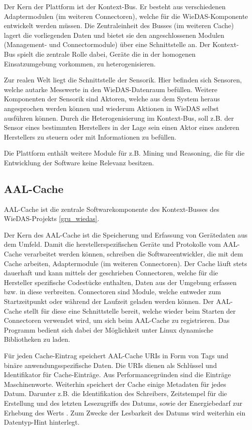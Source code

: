 Der Kern der Plattform ist der Kontext-Bus.
Er besteht aus verschiedenen Adaptermodulen (im weiteren Connectoren), welche für die WieDAS-Komponente
entwickelt werden müssen.
Die Zentraleinheit des Busses (im weiteren Cache) lagert die vorliegenden Daten und bietet sie
den angeschlossenen Modulen (Management- und Connectormodule) über eine Schnittstelle an.
Der Kontext-Bus spielt die zentrale Rolle dabei, Geräte die in der homogenen Einsatzumgebung vorkommen, zu
heterogenisieren.

Zur realen Welt liegt die Schnittstelle der Sensorik.
Hier befinden sich Sensoren, welche autarke Messwerte \cite[Plattform]{wiedas} in den WieDAS-Datenraum
befüllen.
Weitere Komponenten der Sensorik sind Aktoren, welche aus dem System heraus angesprochen werden können
und wiederum Aktionen in WieDAS selbst ausführen können.
Durch die Heterogenisierung im Kontext-Bus, soll z.B. der Sensor eines bestimmten Herstellers in der
Lage sein einen Aktor eines anderen Herstellers zu steuern oder mit Informationen zu befüllen.

Die Plattform enthält weitere Module für z.B. Mining und Reasoning, die für die Entwicklung
der Software keine Relevanz besitzen.

\subsection{AAL-Cache}
\label{gru_aalcache}

AAL-Cache ist die zentrale Softwarekomponente des Kontext-Busses des WieDAS-Projekts \ref{gru_wiedas}.

Der Kern des AAL-Cache ist die Speicherung und Erfassung von Gerätedaten aus dem Umfeld.
Damit die herstellerspezifischen Geräte und Protokolle vom AAL-Cache verarbeitet werden können, schreiben
die Softwareentwickler, die mit dem Cache arbeiten, Adaptermodule (im weiteren Connectoren).
Der Cache läuft stets dauerhaft und kann mittels der geschrieben Connectoren, welche für die
Hersteller spezifische Codestücke enthalten, Daten aus der Umgebung erfassen bzw. in diese verbreiten.
Connectoren sind Module, welche entweder zum Startzeitpunkt oder während der Laufzeit geladen werden
können.
Der AAL-Cache stellt für diese eine Schnittstelle bereit, welche wieder beim Starten der Connectoren
verwendet wird, um sich beim AAL-Cache zu registrieren.
Das Programm bedient sich dabei der Möglichkeit unter Linux dynamische Bibliotheken zu laden.

Für jeden Cache-Eintrag speichert AAL-Cache URIs in Form von Tags und binäre anwendungsspezifische Daten.
Die URIs dienen als Schlüssel und Identifikator für Cache-Einträge.
Aus Performancegründen sind die Einträge Maschinenworte.
Weiterhin speichert der Cache einige Metadaten für jedes Datum.
Darunter z.B. die Identifikation des Schreibers, Zeitstempel für die Erstellung und des letzten
Lesezugriffs des Datums, sowie der Energiebedarf zur Erhebung des Werts \cite{aalcache}.
Zum Zwecke der Lesbarkeit des Datums wird weiterhin ein Datentyp-Hint hinterlegt.

